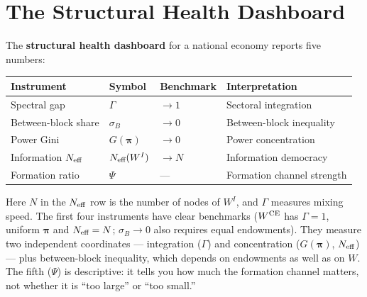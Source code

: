 \documentclass[../structural_economics_book.tex]{subfiles}
\begin{document}
\section{The Structural Health Dashboard}
\label{ch17:sec:dashboard}

\begin{definition}\label{ch17:def:dashboard}
The \textbf{structural health dashboard} for a national economy reports five numbers:
\begin{center}
\begin{tabular}{llll}
\toprule
\textbf{Instrument} & \textbf{Symbol} & \textbf{Benchmark} & \textbf{Interpretation} \\
\midrule
Spectral gap & $\Gamma$ & $\to 1$ & Sectoral integration \\
Between-block share & $\sigma_B$ & $\to 0$ & Between-block inequality \\
Power Gini & $G(\boldsymbol{\pi})$ & $\to 0$ & Power concentration \\
Information $N_{\text{eff}}$ & $N_{\text{eff}}(W^I)$ & $\to N$ & Information democracy \\
Formation ratio & $\Psi$ & --- & Formation channel strength \\
\bottomrule
\end{tabular}
\end{center}
Here $N$ in the $N_{\text{eff}}$ row is the number of nodes of $W^I$, and $\Gamma$ measures mixing speed. The first four instruments have clear benchmarks ($W^{\text{CE}}$ has $\Gamma = 1$, uniform $\boldsymbol{\pi}$ and $N_{\text{eff}} = N$; $\sigma_B \to 0$ also requires equal endowments). They measure two independent coordinates --- integration ($\Gamma$) and concentration ($G(\boldsymbol{\pi})$, $N_{\text{eff}}$) --- plus between-block inequality, which depends on endowments as well as on $W$. The fifth ($\Psi$) is descriptive: it tells you how much the formation channel matters, not whether it is ``too large'' or ``too small.''
\end{definition}
\end{document}
